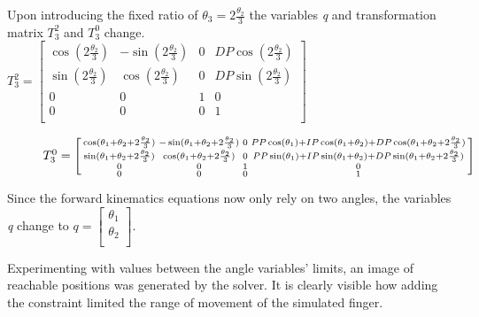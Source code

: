 \documentclass{article}
\begin{document}
Upon introducing the fixed ratio of \(\theta_3 = 2\frac{\theta_2}{3}\) the variables \textit{q} and transformation matrix \(T_3^2\) and \(T_3^0\) change.\\ 
\(T_3^2 = \begin{bmatrix}
       		\cos(2\frac{\theta_2}{3}) & -\sin(2\frac{\theta_2}{3}) & 0 & DP\cos(2\frac{\theta_2}{3}) \\[0.3em]
       		\sin(2\frac{\theta_2}{3}) & \cos(2\frac{\theta_2}{3}) & 0 & DP\sin(2\frac{\theta_2}{3}) \\[0.3em]
       		0 & 0 & 1 & 0 \\[0.3em]
       		0 & 0 & 0 & 1 \\[0.3em]
     \end{bmatrix}     
     \)\\
\begin{figure}[h!]
\(T_3^0 = \begin{bsmallmatrix}
       		\cos(\theta_1+\theta_2+2\frac{\theta_2}{3}) & -\sin(\theta_1+\theta_2+2\frac{\theta_2}{3}) & 0 & PP\cos(\theta_1) + IP\cos(\theta_1 + \theta_2) + DP\cos(\theta_1 + \theta_2 +2\frac{\theta_2}{3}) \\
       		\sin(\theta_1+\theta_2+2\frac{\theta_2}{3}) & \cos(\theta_1+\theta_2+2\frac{\theta_2}{3}) & 0 & PP\sin(\theta_1) + IP\sin(\theta_1 + \theta_2) + DP\sin(\theta_1 + \theta_2 +2\frac{\theta_2}{3}) \\
       		0 & 0 & 1 & 0 \\
       		0 & 0 & 0 & 1 \\
     \end{bsmallmatrix}\)
\end{figure}

Since the forward kinematics equations now only rely on two angles, the variables \textit{q} change to \(q = \begin{bmatrix}\theta_1\\\theta_2\\\end{bmatrix}\).

Experimenting with values between the angle variables' limits, an image of reachable positions was generated by the solver. It is clearly visible how adding the constraint limited the range of movement of the simulated finger.
\end{document}
